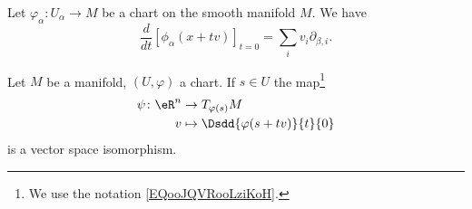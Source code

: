 \begin{proposition}	\label{PROPooOSCIooFPRtRg}
	Let \(\varphi_{\alpha} \colon U_{\alpha}\to M  \) be a chart on the smooth manifold \( M\). We have
	\begin{equation}
		\frac{d}{dt} \left[ \phi_{\alpha}(x+tv)  \right]_{t=0}=\sum_iv_i\partial_{\beta,i}.
	\end{equation}
\end{proposition}


\begin{proposition}     \label{PROPooMEPPooRonxuh}
	Let \( M\) be a manifold, \( (U, \varphi)\) a chart. If \( s\in U\) the map\footnote{We use the notation \eqref{EQooJQVRooLziKoH}.}
	\begin{equation}        \label{EQooJMTJooZNzREy}
		\begin{aligned}
			\psi\colon \eR^n & \to T_{\varphi(s)}M                  \\
			v                & \mapsto \Dsdd{ \varphi(s+tv) }{t}{0}
		\end{aligned}
	\end{equation}
	is a vector space isomorphism.
\end{proposition}

